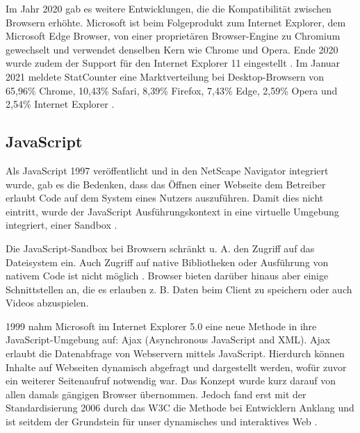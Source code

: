 Im Jahr 2020 gab es weitere Entwicklungen, die die Kompatibilität zwischen Browsern erhöhte. Microsoft ist beim Folgeprodukt zum Internet Explorer, dem Microsoft Edge Browser, von einer proprietären Browser-Engine zu Chromium gewechselt \cite{MicrosoftEdgeChromium} und verwendet denselben Kern wie Chrome und Opera. Ende 2020 wurde zudem der Support für den Internet Explorer 11 eingestellt \cite{MicrosoftInternetExplorerDeprecation}. Im Januar 2021 meldete StatCounter eine Marktverteilung bei Desktop-Browsern von 65,96\% Chrome, 10,43\% Safari, 8,39\% Firefox, 7,43\% Edge, 2,59\% Opera und 2,54\% Internet Explorer \cite{StatCounterBrowserMarketshare}.

\subsection{JavaScript}

Als JavaScript 1997 veröffentlicht und in den NetScape Navigator integriert wurde, gab es die Bedenken, dass das Öffnen einer Webseite dem Betreiber erlaubt Code auf dem System eines Nutzers auszuführen. Damit dies nicht eintritt, wurde der JavaScript Ausführungskontext in eine virtuelle Umgebung integriert, einer Sandbox \cite{LearningJavaScript}.

Die JavaScript-Sandbox bei Browsern schränkt u. A. den Zugriff auf das Dateisystem ein. Auch Zugriff auf native Bibliotheken oder Ausführung von nativem Code ist nicht möglich \cite{TheSpyInTheSandbox}. Browser bieten darüber hinaus aber einige Schnittstellen an, die es erlauben z. B. Daten beim Client zu speichern oder auch Videos abzuspielen.


1999 nahm Microsoft im Internet Explorer 5.0 eine neue Methode in ihre JavaScript-Umgebung auf: Ajax (Asynchronous JavaScript and XML). Ajax erlaubt die Datenabfrage von Webservern mittels JavaScript. Hierdurch können Inhalte auf Webseiten dynamisch abgefragt und dargestellt werden, wofür zuvor ein weiterer Seitenaufruf notwendig war. Das Konzept wurde kurz darauf von allen damals gängigen Browser übernommen. Jedoch fand erst mit der Standardisierung 2006 durch das W3C \cite{TheXMLHttpRequestObject} die Methode bei Entwicklern Anklang und ist seitdem der Grundstein für unser dynamisches und interaktives Web \cite{TheStoryOfXMLHTTP}.

